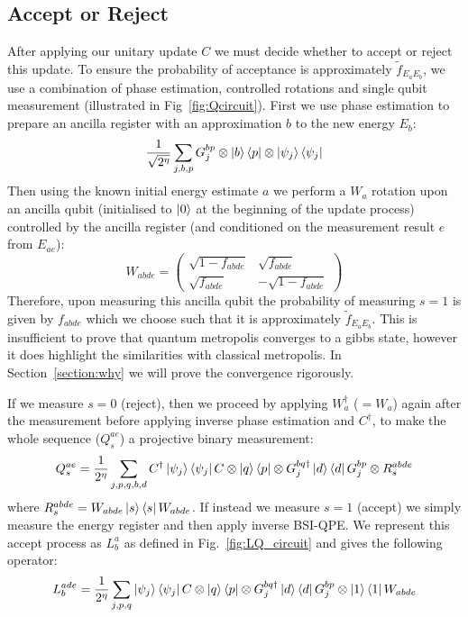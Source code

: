 \documentclass[aps,floatfix,10pt,amssymb,amsfont,amsmath,superscriptaddress,float,nofootinbib,longbibliography,nobalancelastpage,twocolumn]{revtex4-2}
\begin{document}
\subsection{Accept or Reject}
\label{section:acceptprob}
After applying our unitary update $C$ we must decide whether to accept or reject this update. To ensure the probability of acceptance is approximately $\tilde{f}_{E_aE_b}$, we use a combination of phase estimation, controlled rotations and single qubit measurement (illustrated in Fig~\ref{fig:Qcircuit}). First we use phase estimation to prepare an ancilla register with an approximation $b$ to the new energy $E_b$:
\begin{equation}
   \frac{1}{\sqrt{2^{\eta}}}\sum_{j,b,p}G_j^{bp}\otimes\ket{b}\bra{p}\otimes\ket{\psi_j}\bra{\psi_j}
\end{equation}
Then using the known initial energy estimate $a$ we perform a $W_{a}$ rotation upon an ancilla qubit (initialised to $\ket{0}$ at the beginning of the update process) controlled by the ancilla register (and conditioned on the measurement result $e$ from $E_{ae}$):
\begin{equation}
    W_{abde} = \begin{pmatrix}
        \sqrt{1 - f_{abde}} & \sqrt{f_{abde}}\\
       \sqrt{f_{abde}} & -\sqrt{1 - f_{abde}}
    \end{pmatrix}
\end{equation}
Therefore, upon measuring this ancilla qubit the probability of measuring $s=1$ is given by $f_{abde}$ which we choose such that it is approximately $\tilde f_{E_aE_b}$. This is insufficient to prove that quantum metropolis converges to a gibbs state, however it does highlight the similarities with classical metropolis. In Section~\ref{section:why} we will prove the convergence rigorously.

If we measure $s=0$ (reject), then we proceed by applying $W_{a}^{\dagger}$ ($=W_a$) again after the measurement before applying inverse phase estimation and $C^{\dagger}$, to make the whole sequence ($Q_s^{ae}$) a projective binary measurement:
\begin{equation} 
    Q_s^{ae} = \frac{1}{2^{\eta}}\sum_{j,p,q,b,d}  C^{\dagger}\ket{\psi_j}\bra{\psi_j}C \otimes \ket{q}\bra{p} \otimes G_j^{bq\dagger}\ket{d}\bra{d}G_j^{bp}\otimes R^{abde}_s
\end{equation}
where $R^{abde}_s = W_{abde}\ket{s}\bra{s}W_{abde}$. If instead we measure $s=1$ (accept) we simply measure the energy register and then apply inverse BSI-QPE. We represent this accept process as $L^a_b$ as defined in Fig.~\ref{fig:LQ_circuit} and gives the following operator:
\begin{equation}
    L^{ade}_b = \frac{1}{2^{\eta}}\sum_{j,p,q}\ket{\psi_j}\bra{\psi_j}C \otimes \ket{q}\bra{p} \otimes G^{bq\dagger}_j \ket{d}\bra{d}G^{bp}_j \otimes \ket{1}\bra{1}W_{abde}
\end{equation}
\end{document}
